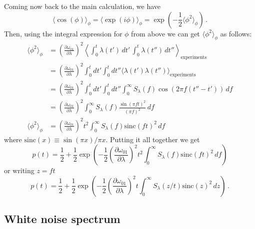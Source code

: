 \documentclass{article}
\begin{document}
Coming now back to the main calculation, we have
\begin{equation}
\langle\cos\left(\phi\right)\rangle_{\phi}
= \langle\exp(i\phi)\rangle_{\phi}
= \exp\left(-\frac{1}{2}\langle\phi^{2}\rangle_{\phi}\right) \, .
\end{equation}
Then, using the integral expression for $\phi$ from above we can
get $\langle\phi^{2}\rangle_{\phi}$ as follows:
\begin{align}
\langle \phi^2 \rangle_{\phi}
& = \left( \frac{\partial \omega_{01}}{\partial\lambda} \right)^2 \left\langle \int_{0}^{t}\lambda(t')\, dt' \, \int_0^t \lambda(t'') \, dt'' \right\rangle _{\textrm{experiments}} \\
& = \left( \frac{\partial\omega_{01}} {\partial\lambda} \right)^2 \int_0^t dt' \int_0^t dt'' \langle\lambda(t') \lambda(t'') \rangle_{\textrm{experiments}} \\
& = \left(\frac{\partial\omega_{01}} {\partial\lambda}\right)^2 \int_0^t dt' \int_0^t dt'' \int_0^{\infty} S_{\lambda}(f) \cos \left( 2\pi f(t''-t') \right) \, df \\
& = \left(\frac{\partial\omega_{01}}{\partial\lambda} \right)^2 \int_0^{\infty} S_{\lambda}(f) \frac{\sin\left(\pi ft\right)^{2}}{\left(\pi f\right)^2} \, df \\
\langle\phi^2 \rangle_{\phi} & = \left(\frac{\partial\omega_{01}}{\partial\lambda} \right)^2 t^2 \int_0^{\infty} S_{\lambda}(f) \textrm{sinc} \left(ft\right)^2 \, df
\end{align}
where $\textrm{sinc}(x)\equiv\sin(\pi x)/\pi x$.
Putting it all together we get
\begin{equation}
p(t) = \frac{1}{2}+\frac{1}{2}\exp\left(-\frac{1}{2}\left(\frac{\partial\omega_{01}}{\partial\lambda}\right)^{2}t^{2}\int_{0}^{\infty}S_{\lambda}(f)\textrm{sinc}(ft)^{2}\, df\right)
\end{equation}
or writing $z=ft$
\begin{equation}
p(t) = \frac{1}{2} + \frac{1}{2} \exp \left( -\frac{1}{2} \left( \frac{\partial\omega_{01}}{\partial\lambda} \right)^2 t \int_0^\infty S_{\lambda} \left( z/t \right) \textrm{sinc}(z)^2 \, dz \right) \, .
\end{equation}


\subsection{White noise spectrum}
\end{document}
